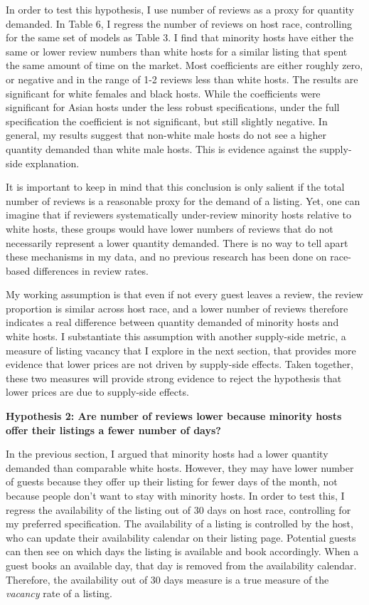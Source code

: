 \documentclass[11pt, oneside]{article}
\begin{document}
In order to test this hypothesis, I use number of reviews as a proxy for quantity demanded. In Table 6, I regress the number of reviews on host race, controlling for the same set of models as Table 3. I find that minority hosts have either the same or lower review numbers than white hosts for a similar listing that spent the same amount of time on the market. Most coefficients are either roughly zero, or negative and in the range of 1-2 reviews less than white hosts. The results are significant for white females and black hosts. While the coefficients were significant for Asian hosts under the less robust specifications, under the full specification the coefficient is not significant, but still slightly negative. In general, my results suggest that non-white male hosts do not see a higher quantity demanded than white male hosts. This is evidence against the supply-side explanation. 

It is important to keep in mind that this conclusion is only salient if the total number of reviews is a reasonable proxy for the demand of a listing. Yet, one can imagine that if reviewers systematically under-review minority hosts relative to white hosts, these groups would have lower numbers of reviews that do not necessarily represent a lower quantity demanded. There is no way to tell apart these mechanisms in my data, and no previous research has been done on race-based differences in review rates. 

My working assumption is that even if not every guest leaves a review, the review proportion is similar across host race, and a lower number of reviews therefore indicates a real difference between quantity demanded of minority hosts and white hosts. I substantiate this assumption with another supply-side metric, a measure of listing vacancy that I explore in the next section, that provides more evidence that lower prices are not driven by supply-side effects. Taken together, these two measures will provide strong evidence to reject the hypothesis that lower prices are due to supply-side effects. 
    
    
\textbf{Hypothesis 2: Are number of reviews lower because minority hosts offer their listings a fewer number of days?}

In the previous section, I argued that minority hosts had a lower quantity demanded than comparable white hosts. However, they may have lower number of guests because they offer up their listing for fewer days of the month, not because people don't want to stay with minority hosts. In order to test this, I regress the availability of the listing out of 30 days on host race, controlling for my preferred specification. The availability of a listing is controlled by the host, who can update their availability calendar on their listing page. Potential guests can then see on which days the listing is available and book accordingly. When a guest books an available day, that day is removed from the availability calendar. Therefore, the availability out of 30 days measure is a true measure of the \textit{vacancy} rate of a listing.
\end{document}

